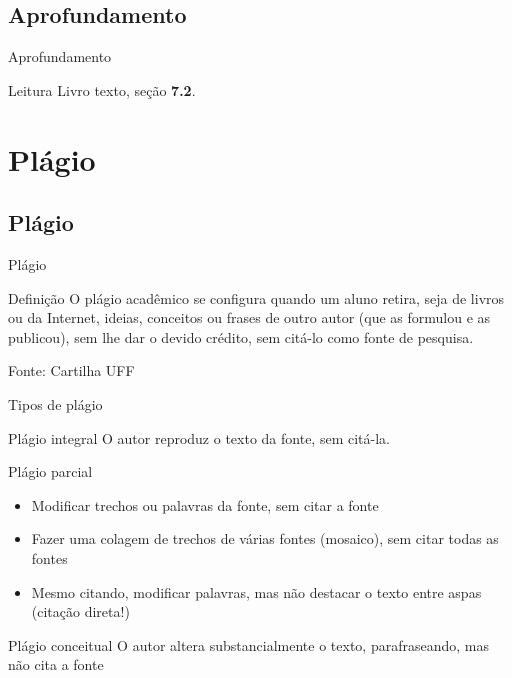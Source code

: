 \documentclass{beamer}
\begin{document}
\subsection{Aprofundamento}

\begin{frame}{Aprofundamento}
  \begin{block}{Leitura}
    Livro texto, seção {\bf 7.2}.
  \end{block}
\end{frame}

\section{Plágio}

\subsection{Plágio}

\begin{frame}{Plágio}
  \begin{block}{Definição}
    \footnotesize
    O plágio acadêmico se configura quando um aluno retira, seja de
    livros ou da Internet, ideias, conceitos ou frases de outro autor
    (que as formulou e as publicou), sem lhe dar o devido crédito, sem
    citá-lo como fonte de pesquisa.
  \end{block}

  Fonte: Cartilha UFF
\end{frame}

\begin{frame}{Tipos de plágio}
  \begin{block}{Plágio integral}
    \footnotesize
    O autor \alert{reproduz} o texto da fonte, sem citá-la.
  \end{block}
  \bigskip
  \begin{block}{Plágio parcial}
    \begin{itemize}
      \footnotesize
    \item Modificar trechos ou palavras da fonte, sem citar a fonte
    \item Fazer uma colagem de trechos de várias fontes (mosaico), sem
      citar \alert{todas} as fontes
    \item \alert{Mesmo citando}, modificar palavras, mas não destacar
      o texto entre aspas (citação direta!)
    \end{itemize}
  \end{block}
  \bigskip
  \begin{block}{Plágio conceitual}
    \footnotesize
    O autor altera substancialmente o texto, parafraseando, mas não
    cita a fonte
  \end{block}
\end{frame}
\end{document}
